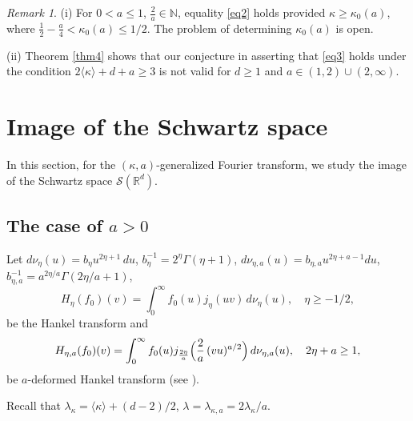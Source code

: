 \documentclass[12pt,twoside,reqno]{amsart}\usepackage[cp1251]{inputenc}
\theoremstyle{plain}
\theoremstyle{remark}
\newtheorem{remark}[theorem]{Remark}
\begin{document}
\begin{remark}\label{rem4}
(i) For $0<a\le 1$, $\frac{2}{a}\in\mathbb{N}$, equality \eqref{eq2}  holds provided  $\kappa\ge\kappa_0(a)$, where  $\frac{1}{2}-\frac{a}{4}<\kappa_0(a)\le 1/2$.
The problem of determining  $\kappa_0(a)$ is open.

\smallbreak
(ii) Theorem \ref{thm4} shows that our conjecture in \cite{GIT16} asserting that
\eqref{eq3} holds under the condition $2\langle\kappa\rangle+d+a\ge3$
is not valid for $d\ge 1$ and $a\in (1,2)\cup (2,\infty)$.
\end{remark}

\vspace{0.6mm}

\section{Image of the Schwartz space}\label{sec5}

In this section, for the $(\kappa,a)$-generalized Fourier transform, we study the image of the Schwartz space $\mathcal{S}(\mathbb{R}^d)$.
\subsection{The case of $a>0$}
Let $d\nu_{\eta}(u)=b_{\eta}u^{2\eta+1}\,du$, $b_{\eta}^{-1}=2^{\eta}\Gamma(\eta+1)$,
$d\nu_{\eta,a}(u)=b_{\eta,a}u^{2\eta+a-1}du$, $b_{\eta,a}^{-1}=a^{2\eta/a}\Gamma(2\eta/a+1)$,
\[
H_{\eta}(f_0)(v)=\int_{0}^{\infty}f_0(u)j_{\eta}(uv)\,d\nu_{\eta}(u),\quad \eta\ge-1/2,
\]
be the Hankel transform and
\[
H_{\eta,a}(f_0)(v)=\int_{0}^{\infty}f_0(u)j_{\frac{2\eta}{a}}\Bigl(\frac{2}{a}\,(vu)^{a/2} \Bigr)\,d\nu_{\eta,a}(u),\quad 2\eta+a\ge 1,
\]
be $a$-deformed Hankel transform (see \cite{SKO12,GIT16}).

Recall that $\lambda_{\kappa}=\langle \kappa\rangle+(d-2)/2$, $\lambda=\lambda_{\kappa,a}=2\lambda_{\kappa}/a$.
\end{document}
